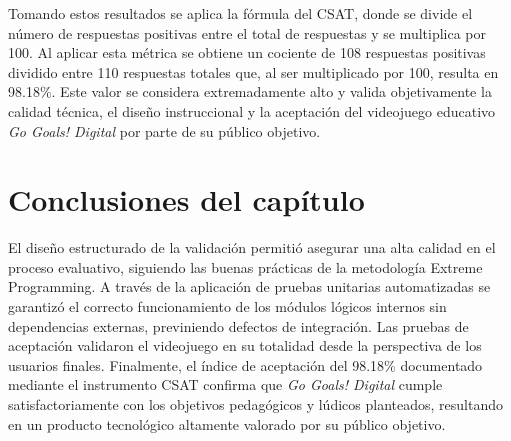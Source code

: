 Tomando estos resultados se aplica la fórmula del CSAT, donde se divide el número de respuestas positivas entre el total de respuestas y se multiplica por 100. Al aplicar esta métrica se obtiene un cociente de 108 respuestas positivas dividido entre 110 respuestas totales que, al ser multiplicado por 100, resulta en 98.18\%. Este valor se considera extremadamente alto y valida objetivamente la calidad técnica, el diseño instruccional y la aceptación del videojuego educativo \textit{Go Goals! Digital} por parte de su público objetivo.

\section*{Conclusiones del capítulo}

El diseño estructurado de la validación permitió asegurar una alta calidad en el proceso evaluativo, siguiendo las buenas prácticas de la metodología Extreme Programming. A través de la aplicación de pruebas unitarias automatizadas se garantizó el correcto funcionamiento de los módulos lógicos internos sin dependencias externas, previniendo defectos de integración. Las pruebas de aceptación validaron el videojuego en su totalidad desde la perspectiva de los usuarios finales. Finalmente, el índice de aceptación del 98.18\% documentado mediante el instrumento CSAT confirma que \textit{Go Goals! Digital} cumple satisfactoriamente con los objetivos pedagógicos y lúdicos planteados, resultando en un producto tecnológico altamente valorado por su público objetivo.
